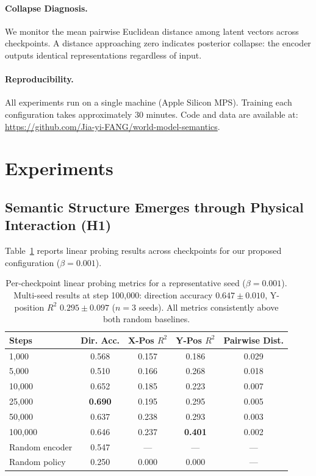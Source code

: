 \documentclass{article}
\begin{document}
\paragraph{Collapse Diagnosis.}
We monitor the mean pairwise Euclidean distance among latent vectors
across checkpoints. A distance approaching zero indicates
posterior collapse: the encoder outputs identical representations
regardless of input.

\paragraph{Reproducibility.}
All experiments run on a single machine (Apple Silicon MPS).
Training each configuration takes approximately 30 minutes.
Code and data are available at:
\url{https://github.com/Jia-yi-FANG/world-model-semantics}.

\section{Experiments}
\label{sec:experiments}

\subsection{Semantic Structure Emerges through Physical Interaction (H1)}

Table~\ref{tab:probing} reports linear probing results across checkpoints
for our proposed configuration ($\beta = 0.001$).

\begin{table}[h]
\centering
\caption{Per-checkpoint linear probing metrics for a representative seed ($\beta = 0.001$).
         Multi-seed results at step 100{,}000: direction accuracy $0.647 \pm 0.010$,
         Y-position $R^2$ $0.295 \pm 0.097$ ($n=3$ seeds).
         All metrics consistently above both random baselines.}
\label{tab:probing}
\begin{tabular}{lcccc}
\toprule
Steps & Dir. Acc. & X-Pos $R^2$ & Y-Pos $R^2$ & Pairwise Dist. \\
\midrule
1{,}000   & 0.568 & 0.157 & 0.186 & 0.029 \\
5{,}000   & 0.510 & 0.166 & 0.268 & 0.018 \\
10{,}000  & 0.652 & 0.185 & 0.223 & 0.007 \\
25{,}000  & \textbf{0.690} & 0.195 & 0.295 & 0.005 \\
50{,}000  & 0.637 & 0.238 & 0.293 & 0.003 \\
100{,}000 & 0.646 & 0.237 & \textbf{0.401} & 0.002 \\
\midrule
Random encoder & 0.547 & — & — & — \\
Random policy  & 0.250 & 0.000 & 0.000 & — \\
\bottomrule
\end{tabular}
\end{table}
\end{document}
